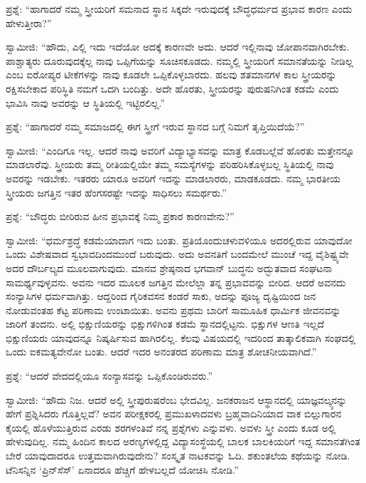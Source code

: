 \vskip 5pt

ಪ್ರಶ್ನೆ: “ಹಾಗಾದರೆ ನಮ್ಮ ಸ್ತ್ರೀಯರಿಗೆ ಸಮನಾದ ಸ್ಥಾನ ಸಿಕ್ಕದೇ ಇರುವುದಕ್ಕೆ ಬೌದ್ಧಧರ್ಮದ ಪ್ರಭಾವ ಕಾರಣ ಎಂದು ಹೇಳುತ್ತೀರಾ?”

\vskip 5pt

ಸ್ವಾಮೀಜಿ: “ಹೌದು, ಎಲ್ಲಿ ಇದು ಇದೆಯೋ ಅದಕ್ಕೆ ಕಾರಣವೇ ಅದು. ಆದರೆ ಇಲ್ಲಿ\break ನಾವು ಜೋಪಾನವಾಗಿರಬೇಕು. ಪಾಶ್ಚಾತ್ಯರು ದೂರುವುದಕ್ಕೆಲ್ಲ ನಾವು ಒಪ್ಪಿಗೆಯನ್ನು ಸೂಚಿಸಕೂಡದು. ನಮ್ಮಲ್ಲಿ ಸ್ತ್ರೀಯರಿಗೆ ಸಮಾನತೆಯನ್ನು ನೀಡಿಲ್ಲ ಎಂಬ ಐರೋಪ್ಯರ ಟೀಕೆಗಳನ್ನು ನಾವು ಕೂಡಲೇ ಒಪ್ಪಿಕೊಳ್ಳಬಾರದು. ಹಲವು ಶತಮಾನಗಳ ಕಾಲ ಸ್ತ್ರೀಯರನ್ನು ರಕ್ಷಿಸಬೇಕಾದ ಪರಿಸ್ಥಿತಿ ನಮಗೆ ಒದಗಿ ಬಂದಿತ್ತು. ಅದೇ ಹೊರತು, ಸ್ತ್ರೀಯರನ್ನು ಪುರುಷನಿಗಿಂತ ಕಡಮೆ ಎಂದು ಭಾವಿಸಿ ನಾವು ಅವರನ್ನು ಆ ಸ್ಥಿತಿಯಲ್ಲಿ ಇಟ್ಟಿರಲಿಲ್ಲ.”

\vskip 5pt

ಪ್ರಶ್ನೆ: “ಹಾಗಾದರೆ ನಮ್ಮ ಸಮಾಜದಲ್ಲಿ ಈಗ ಸ್ತ್ರೀಗೆ ಇರುವ ಸ್ಥಾನದ ಬಗ್ಗೆ ನಿಮಗೆ ತೃಪ್ತಿಯಿದೆಯೆ?”

\vskip 5pt

ಸ್ವಾಮೀಜಿ: “ಎಂದಿಗೂ ಇಲ್ಲ. ಆದರೆ ನಾವು ಅವರಿಗೆ ವಿದ್ಯಾಭ್ಯಾಸವನ್ನು ಮಾತ್ರ ಕೊಡಬಲ್ಲೆವೆ ಹೊರತು ಮತ್ತೇನನ್ನೂ ಮಾಡಲಾರೆವು. ಸ್ತ್ರೀಯರು ತಮ್ಮ ರೀತಿಯಲ್ಲಿಯೇ ತಮ್ಮ ಸಮಸ್ಯೆಗಳನ್ನು ಪರಿಹರಿಸಿಕೊಳ್ಳಬಲ್ಲ ಸ್ಥಿತಿಯಲ್ಲಿ ನಾವು ಅವರನ್ನು ಇಡಬೇಕು. ಇತರರು ಯಾರೂ ಅವರಿಗೆ ಇದನ್ನು ಮಾಡಲಾರರು, ಮಾಡಕೂಡದು. ನಮ್ಮ ಭಾರತೀಯ ಸ್ತ್ರೀಯರು ಜಗತ್ತಿನ ಇತರ ಹೆಂಗಸರಷ್ಟೇ ಇದನ್ನು ಸಾಧಿಸಲು ಸಮರ್ಥರು.”

\vskip 5pt

ಪ್ರಶ್ನೆ: “ಬೌದ್ಧರು ಬೀರಿರುವ ಹೀನ ಪ್ರಭಾವಕ್ಕೆ ನಿಮ್ಮ ಪ್ರಕಾರ ಕಾರಣವೇನು?”

\vskip 5pt

ಸ್ವಾಮೀಜಿ: “ಧರ್ಮಶ್ರದ್ಧೆ ಕಡಮೆಯಾದಾಗ ಇದು ಬಂತು. ಪ್ರತಿಯೊಂದು\break ಚಳುವಳಿಯೂ ಅದರಲ್ಲಿರುವ ಯಾವುದೋ ಒಂದು ವಿಶೇಷವಾದ ಸ್ವಭಾವದಿಂದ\break ಮುಂದೆ ಬರುವುದು. ಅದು ಅವನತಿಗೆ ಬಂದಮೇಲೆ ಮುಂಚೆ ಇದ್ದ ವೈಶಿಷ್ಟ್ಯವೇ ಅದರ ದೌರ್ಬಲ್ಯದ ಮೂಲವಾಗುವುದು. ಮಾನವ ಶ್ರೇಷ್ಠನಾದ ಭಗವಾನ್​ ಬುದ್ಧನು ಅದ್ಭುತವಾದ ಸಂಘಟನಾ ಸಾಮರ್ಥ್ಯವುಳ್ಳವನು. ಅವನು ಇದರ ಮೂಲಕ ಜಗತ್ತಿನ ಮೇಲೆಲ್ಲಾ ತನ್ನ ಪ್ರಭಾವವನ್ನು ಬೀರಿದ. ಆದರೆ ಅವನದು ಸಂನ್ಯಾಸಿಗಳ ಧರ್ಮವಾಗಿತ್ತು. ಆದ್ದರಿಂದ ಗೈರಿಕವಸನ ಕಂಡರೆ ಸಾಕು, ಅದನ್ನು ಪೂಜ್ಯ ದೃಷ್ಟಿಯಿಂದ ಜನ ನೋಡುವಂತಹ ಕೆಟ್ಟ ಪರಿಣಾಮ ಉಂಟಾಯಿತು. ಅವನು ಪ್ರಥಮ ಬಾರಿಗೆ ಸಾಮೂಹಿಕ ಧಾರ್ಮಿಕ ಜೀವನವನ್ನು ಜಾರಿಗೆ ತಂದನು. ಅಲ್ಲಿ ಭಿಕ್ಷುಣಿಯರನ್ನು ಭಿಕ್ಷುಗಳಿಗಿಂತ ಕಡಮೆ ಸ್ಥಾನದಲ್ಲಿಟ್ಟನು. ಭಿಕ್ಷುಗಳ ಆಣತಿ ಇಲ್ಲದೆ ಭಿಕ್ಷುಣಿಯರು ಯಾವುದನ್ನೂ ನಿಷ್ಕರ್ಷಿಸುವ ಹಾಗಿರಲಿಲ್ಲ. ಕೆಲವು ವಿಷಯದಲ್ಲಿ ಇದರಿಂದ ತಾತ್ಕಾಲಿಕವಾಗಿ ಸಂಘದಲ್ಲಿ ಒಂದು ಐಕಮತ್ಯವೇನೋ ಬಂತು. ಆದರೆ ಇದರ ಅನಂತರದ ಪರಿಣಾಮ ಮಾತ್ರ ಶೋಚನೀಯವಾಗಿದೆ.”

\vskip 5pt

ಪ್ರಶ್ನೆ: “ಆದರೆ ವೇದದಲ್ಲಿಯೂ ಸಂನ್ಯಾಸವನ್ನು ಒಪ್ಪಿಕೊಂಡಿರುವರು.”

\vskip 5pt

ಸ್ವಾಮೀಜಿ: “ಹೌದು ನಿಜ. ಆದರೆ ಅಲ್ಲಿ ಸ್ತ್ರೀಪುರುಷರೆಂಬ ಭೇದವಿಲ್ಲ. ಜನಕರಾಜನ ಆಸ್ಥಾನದಲ್ಲಿ ಯಾಜ್ಞವಲ್ಕ್ಯನನ್ನು ಹೇಗೆ ಪ್ರಶ್ನಿಸಿದರು ಗೊತ್ತಿಲ್ಲವೆ? ಅವನ ಪರೀಕ್ಷಕರಲ್ಲಿ ಪ್ರಮುಖಳಾದವಳು ಬ್ರಹ್ಮವಾದಿನಿಯಾದ ವಾಕ ಬಿಲ್ಲುಗಾರನ ಕೈಯಲ್ಲಿ ಹೊಳೆಯುತ್ತಿರುವ ಎರಡು ಶರಗಳಂತಿವೆ ನನ್ನ ಪ್ರಶ್ನೆಗಳು ಎನ್ನುವಳು. ಅವಳು ಸ್ತ್ರೀ ಎಂದು ಕೂಡ ಅಲ್ಲಿ ಹೇಳುವುದಿಲ್ಲ. ನಮ್ಮ ಹಿಂದಿನ ಕಾಲದ ಅರಣ್ಯಗಳಲ್ಲಿದ್ದ ವಿದ್ಯಾಸಂಸ್ಥೆಯಲ್ಲಿ ಬಾಲಕ ಬಾಲಕಿಯರಿಗೆ ಇದ್ದ ಸಮಾನತೆಗಿಂತ ಬೇರೆ ಯಾವುದಾದರೂ ಉತ್ತಮವಾಗಿರುವುದೇನು? ಸಂಸ್ಕೃತ ನಾಟಕವನ್ನು ಓದಿ. ಶಕುಂತಲೆಯ ಕಥೆಯನ್ನು ನೋಡಿ. ಟೆನಿಸನ್ನಿನ ‘ಪ್ರಿನ್​ಸೆಸ್​’ ಏನಾದರೂ ಹೆಚ್ಚಿಗೆ ಹೇಳಬಲ್ಲದೆ ಯೋಚಿಸಿ ನೋಡಿ.”

